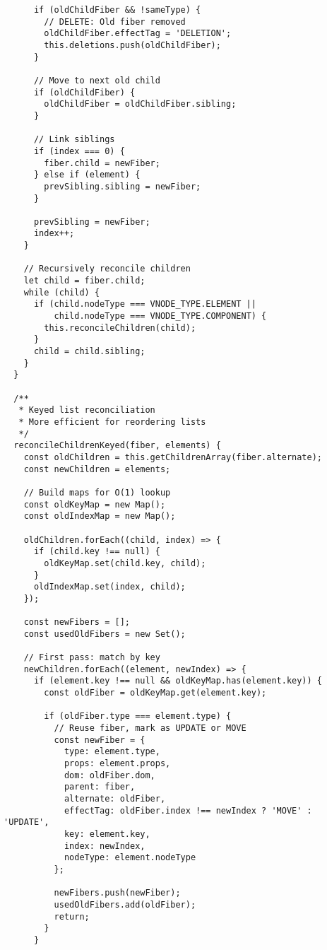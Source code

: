 \documentclass[11pt]{article}
\begin{document}
\begin{verbatim}
      if (oldChildFiber && !sameType) {
        // DELETE: Old fiber removed
        oldChildFiber.effectTag = 'DELETION';
        this.deletions.push(oldChildFiber);
      }
      
      // Move to next old child
      if (oldChildFiber) {
        oldChildFiber = oldChildFiber.sibling;
      }
      
      // Link siblings
      if (index === 0) {
        fiber.child = newFiber;
      } else if (element) {
        prevSibling.sibling = newFiber;
      }
      
      prevSibling = newFiber;
      index++;
    }
    
    // Recursively reconcile children
    let child = fiber.child;
    while (child) {
      if (child.nodeType === VNODE_TYPE.ELEMENT || 
          child.nodeType === VNODE_TYPE.COMPONENT) {
        this.reconcileChildren(child);
      }
      child = child.sibling;
    }
  }
  
  /**
   * Keyed list reconciliation
   * More efficient for reordering lists
   */
  reconcileChildrenKeyed(fiber, elements) {
    const oldChildren = this.getChildrenArray(fiber.alternate);
    const newChildren = elements;
    
    // Build maps for O(1) lookup
    const oldKeyMap = new Map();
    const oldIndexMap = new Map();
    
    oldChildren.forEach((child, index) => {
      if (child.key !== null) {
        oldKeyMap.set(child.key, child);
      }
      oldIndexMap.set(index, child);
    });
    
    const newFibers = [];
    const usedOldFibers = new Set();
    
    // First pass: match by key
    newChildren.forEach((element, newIndex) => {
      if (element.key !== null && oldKeyMap.has(element.key)) {
        const oldFiber = oldKeyMap.get(element.key);
        
        if (oldFiber.type === element.type) {
          // Reuse fiber, mark as UPDATE or MOVE
          const newFiber = {
            type: element.type,
            props: element.props,
            dom: oldFiber.dom,
            parent: fiber,
            alternate: oldFiber,
            effectTag: oldFiber.index !== newIndex ? 'MOVE' : 'UPDATE',
            key: element.key,
            index: newIndex,
            nodeType: element.nodeType
          };
          
          newFibers.push(newFiber);
          usedOldFibers.add(oldFiber);
          return;
        }
      }
      

\end{verbatim}
\end{document}

